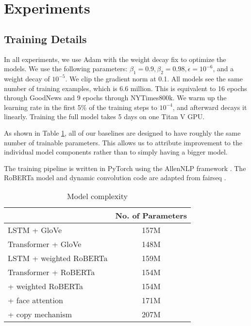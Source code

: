 \section{Experiments}

\subsection{Training Details}

In all experiments, we use Adam \cite{Kingma2015Adam} with the weight decay fix
\cite{Loshchilov2018DecoupledWD} to optimize the models. We use the following
parameters: $\beta_1 = 0.9, \beta_2 = 0.98, \epsilon = 10^{-6}$, and a weight
decay of $10^{-5}$. We clip the gradient norm at 0.1. All models see the same
number of training examples, which is 6.6 million. This is equivalent to 16
epochs through GoodNews and 9 epochs through NYTimes800k. We warm up the
learning rate in the first 5\% of the training steps to $10^{-4}$, and
afterward decays it linearly. Training the full model takes 5 days on one Titan
V GPU.

As shown in Table \ref{tab:models}, all of our baselines are designed to have
roughly the same number of trainable parameters. This allows us to attribute
improvement to the individual model components rather than to simply having a
bigger model.

The training pipeline is written in PyTorch \cite{Paszke2017Automatic} using
the AllenNLP framework \cite{Gardner2017AllenNLP}. The RoBERTa model and
dynamic convolution code are adapted from fairseq \cite{Ott2019Fairseq}.

\begin{table}[t]
	\caption {Model complexity}
	\label{tab:models}
	\centering
	\begin{tabularx}{\linewidth}{Xc}
		\toprule
        & No. of Parameters \\
      \midrule
      LSTM + GloVe & 157M \\
      Transformer + GloVe & 148M \\
      LSTM + weighted RoBERTa & 159M \\
      \midrule
      Transformer + RoBERTa & 154M \\
      \quad + weighted RoBERTa & 154M \\
      \quad\quad + face attention & 171M \\
      \quad\quad\quad + copy mechanism & 207M \\
		\bottomrule
	\end{tabularx}
\end{table}

